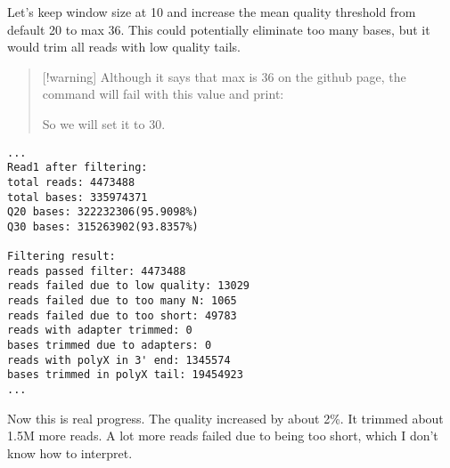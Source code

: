 Let's keep window size at 10 and increase the mean quality threshold
from default 20 to max 36. This could potentially eliminate too many
bases, but it would trim all reads with low quality tails.

\begin{quote}
{[}!warning{]} Although it says that max is 36 on the github page, the
command will fail with this value and print:

\begin{Shaded}
\begin{Highlighting}[]
\ErrorTok{(}\KeywordTok{)} 
\end{Highlighting}
\end{Shaded}

So we will set it to 30.
\end{quote}

\begin{Shaded}
\begin{Highlighting}[]
\end{Highlighting}
\end{Shaded}

\begin{verbatim}
...
Read1 after filtering:
total reads: 4473488
total bases: 335974371
Q20 bases: 322232306(95.9098%)
Q30 bases: 315263902(93.8357%)

Filtering result:
reads passed filter: 4473488
reads failed due to low quality: 13029
reads failed due to too many N: 1065
reads failed due to too short: 49783
reads with adapter trimmed: 0
bases trimmed due to adapters: 0
reads with polyX in 3' end: 1345574
bases trimmed in polyX tail: 19454923
...
\end{verbatim}

Now this is real progress. The quality increased by about 2\%. It
trimmed about 1.5M more reads. A lot more reads failed due to being too
short, which I don't know how to interpret.

